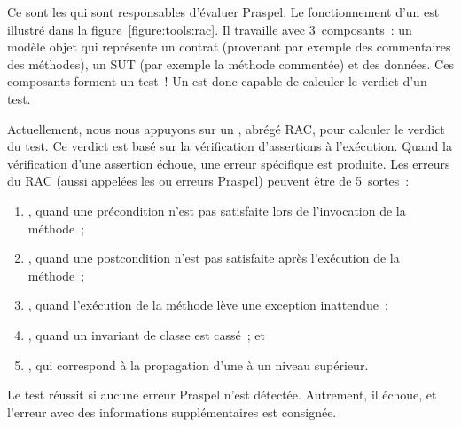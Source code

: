 Ce sont les  qui sont responsables d'évaluer
Praspel. Le fonctionnement d'un  est illustré dans
la figure~\ref{figure:tools:rac}. Il travaille avec 3~composants~: un modèle
objet qui représente un contrat (provenant par exemple des commentaires des
méthodes), un SUT (par exemple la méthode commentée) et des données. Ces
composants forment un test~! Un  est donc capable
de calculer le verdict d'un test.

Actuellement, nous nous appuyons sur un ,
abrégé RAC, pour calculer le verdict du test. Ce verdict est basé sur la
vérification d'assertions à l'exécution. Quand la vérification d'une assertion
échoue, une erreur spécifique est produite. Les erreurs du RAC (aussi appelées
les  ou erreurs Praspel) peuvent être de 5~sortes~:
%
\begin{enumerate}

\item {}, quand une précondition n'est pas
satisfaite lors de l'invocation de la méthode~;

\item {}, quand une postcondition n'est pas
satisfaite après l'exécution de la méthode~;

\item {}, quand l'exécution de la méthode lève une
exception inattendue~;

\item {}, quand un invariant de classe est cassé~; et

\item {}, qui correspond à la propagation
d'une  à un niveau supérieur.

\end{enumerate}
%
Le test réussit si aucune erreur Praspel n'est détectée. Autrement, il échoue,
et l'erreur avec des informations supplémentaires est consignée.

